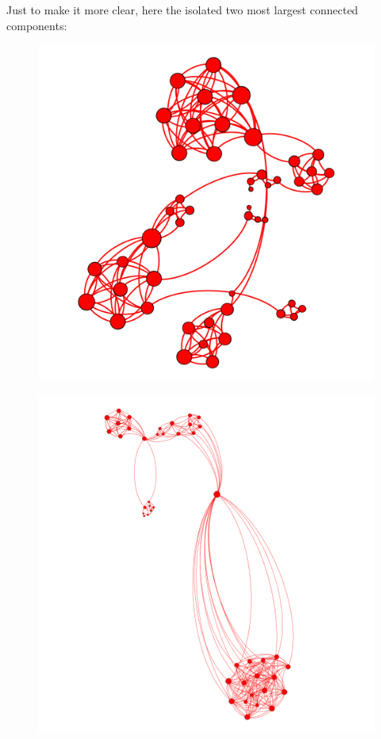\documentclass{article}
\begin{document}
        \noindent Just to make it more clear, here the isolated two most largest connected components:
        \begin{figure}[H]
            \centering
            \begin{minipage}[b]{0.4\textwidth}
              \includegraphics[width=\textwidth]{2.1.png}
            \label{fig:figure-2.1}
            \end{minipage}
            \begin{minipage}[b]{0.55\textwidth}
              \includegraphics[width=\textwidth]{2.2.png}
            \label{fig:figure-2.2}
            \end{minipage}
            \label{fig:figure-2}
        \end{figure}
        
\end{document}
